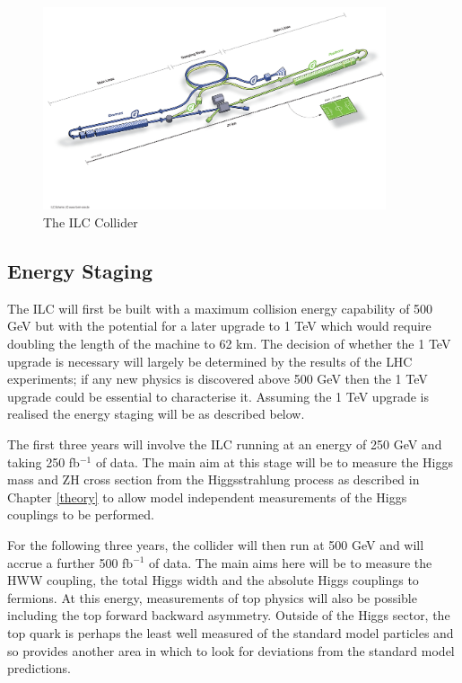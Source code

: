 \begin{figure}
  \centering
  \includegraphics[width=0.9\textwidth,keepaspectratio]{Experiments/fig/ILC}
  \caption[The ILC Experiment]{The \ac{ILC} Collider\cite{ILCTDR}}
  \label{Fig:ILC}
\end{figure}

\subsection{Energy Staging}

The \ac{ILC} will first be built with a maximum collision energy capability of 500 GeV but with the potential for a later upgrade to 1 TeV which would require doubling the length of the machine to 62 km. The decision of whether the 1 TeV upgrade is necessary will largely be determined by the results of the \ac{LHC} experiments; if any new physics is discovered above 500 GeV then the 1 TeV upgrade could be essential to characterise it. Assuming the 1 TeV upgrade is realised the energy staging will be as described below.

The first three years will involve the ILC running at an energy of 250 GeV and taking 250 fb${^{-1}}$ of data. The main aim at this stage will be to measure the Higgs mass and ZH cross section from the Higgsstrahlung process as described in Chapter \ref{theory} to allow model independent measurements of the Higgs couplings to be performed.

For the following three years, the collider will then run at 500 GeV and will accrue a further 500 fb${^{-1}}$ of data. The main aims here will be to measure the HWW coupling, the total Higgs width and the absolute Higgs couplings to fermions. At this energy, measurements of top physics will also be possible including the top forward backward asymmetry. Outside of the Higgs sector, the top quark is perhaps the least well measured of the standard model particles and so provides another area in which to look for deviations from the standard model predictions.

